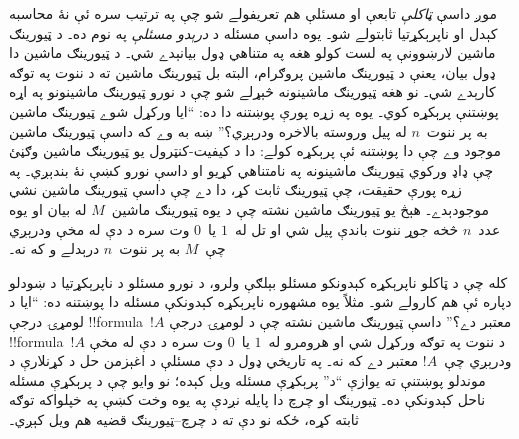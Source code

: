 \documentclass[../../../include/open-logic-section]{subfiles}
\begin{document}
موږ داسې \emph{ټاکلې} تابعې او مسئلې هم تعريفولے شو چې په ترتيب سره
ئې نۀ محاسبه کېدل او ناپرېکړتيا ثابتولے شو۔ يوه داسې مسئله د
\emph{درېدو مسئلې} په نوم ده۔ د ټيورينګ ماشين لارښوونې په لست کولو
هغه په متناهي ډول بيانېدے شي۔ د ټيورينګ ماشين دا ډول بيان، يعنې د
ټيورينګ ماشين پروګرام، البته بل ټيورينګ ماشين ته د ننوت په توګه
کارېدے شي۔ نو هغه ټيورينګ ماشينونه څېړلے شو چې د نورو ټيورينګ
ماشينونو په اړه پوښتنې پرېکړه کوي۔ يوه په زړه پورې پوښتنه دا ده:
``ايا ورکړل شوے ټيورينګ ماشين به پر ننوت~$n$ له پيل وروسته بالاخره
ودرېږي؟'' ښه به وے که داسې ټيورينګ ماشين موجود وے چې دا پوښتنه ئې
پرېکړه کولے: دا د کيفيت-کنټرول يو ټيورينګ ماشين وګڼئ چې ډاډ ورکوي
ټيورينګ ماشينونه په نامتناهي کړيو او داسې نورو کښې نۀ بندېږي۔ په زړه
پورې حقيقت، چې ټيورينګ ثابت کړ، دا دے چې داسې ټيورينګ ماشين نشي
موجودېدے۔ هېڅ يو ټيورينګ ماشين نشته چې د يوه ټيورينګ ماشين~$M$ له
بيان او يوه عدد~$n$ څخه جوړ ننوت باندې پيل شي او تل له~$1$ يا~$0$
وت سره د دې له مخې ودرېږي چې~$M$ به پر ننوت~$n$ درېدلے و که نه۔

کله چې د ټاکلو ناپرېکړه کېدونکو مسئلو بېلګې ولرو، د نورو مسئلو د
ناپرېکړتيا د ښودلو دپاره ئې هم کارولے شو۔ مثلاً يوه مشهوره
ناپرېکړه کېدونکې مسئله دا پوښتنه ده: ``ايا د لومړۍ درجې
!!{formula}~$!A$ معتبر دے؟'' داسې ټيورينګ ماشين نشته چې د لومړۍ درجې
!!{formula}~$!A$ د ننوت په توګه ورکړل شي او هرومرو له~$1$ يا~$0$ وت
سره د دې له مخې ودرېږي چې~$!A$ معتبر دے که نه۔ په تاريخي ډول د دې
مسئلې د اغېزمن حل د کړنلارې د موندلو پوښتنې ته يوازې ``د'' پرېکړې
مسئله ويل کېده؛ نو وايو چې د پرېکړې مسئله ناحل کېدونکې ده۔ ټيورينګ
او چرچ دا پايله نږدې په يوه وخت کښې په خپلواکه توګه ثابته کړه، ځکه
نو دې ته د چرچ--ټيورينګ قضيه هم ويل کېږي۔
\end{document}
